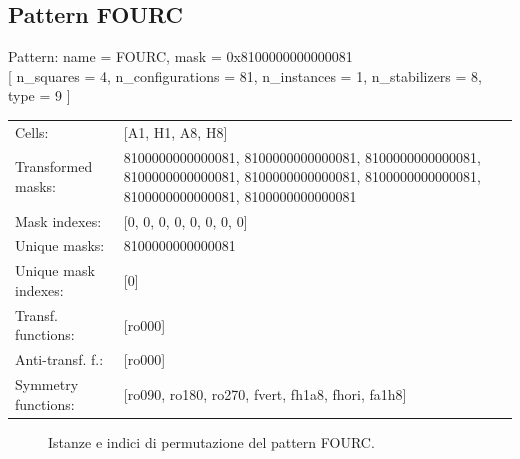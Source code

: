 \newpage

\subsection{Pattern FOURC}

\begin{tcolorbox}[sharp corners, fontupper=\ttfamily\small, colback=white]
  \noindent Pattern: name = FOURC, mask = 0x8100000000000081\\
  {[} n\_squares = 4, n\_configurations = 81,
  n\_instances = 1, n\_stabilizers = 8, type = 9 { ]}\\[1.0ex]
  \begin{tabularx}{\textwidth}{@{} p{3.5cm} X @{}}
    Cells:               & {[}A1, H1, A8, H8{]}\\[0.5ex]
    Transformed masks:   & 8100000000000081, 8100000000000081, 8100000000000081, 8100000000000081, 8100000000000081, 8100000000000081, 8100000000000081, 8100000000000081\\[0.5ex]
    Mask indexes:        & {[}0, 0, 0, 0, 0, 0, 0, 0{]}\\[0.5ex]
    Unique masks:        & 8100000000000081\\[0.5ex]
    Unique mask indexes: & {[}0{]}\\[0.5ex]
    Transf. functions:   & {[}ro000{]}\\[0.5ex]
    Anti-transf. f.:     & {[}ro000{]}\\[0.5ex]
    Symmetry functions:  & {[}ro090, ro180, ro270, fvert, fh1a8, fhori, fa1h8{]}\\[0.5ex]
  \end{tabularx}
\end{tcolorbox}

\begin{figure}[htbp]
  \centering
   \hfill
   \hfill
   \hfill
  \vspace{0.3cm}
   \hfill
   \hfill
   \hfill
  \caption{Istanze e indici di permutazione del pattern FOURC.}
\end{figure}

\newpage

